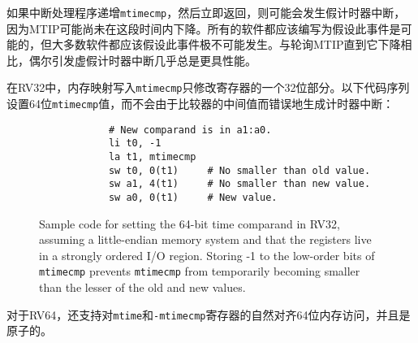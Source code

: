 {\iffalse
\begin{commentary}
	A spurious timer interrupt might occur if an interrupt handler increments {\tt
		mtimecmp} then immediately returns, because MTIP might not yet have fallen in
	the interim.  All software should be written to assume this event is possible,
	but most software should assume this event is extremely unlikely.  It is
	almost always more performant to incur an occasional spurious timer interrupt
	than to poll MTIP until it falls.
\end{commentary}
\fi
\begin{commentary}
如果中断处理程序递增{\tt mtimecmp}，然后立即返回，则可能会发生假计时器中断，因为MTIP可能尚未在这段时间内下降。所有的软件都应该编写为假设此事件是可能的，但大多数软件都应该假设此事件极不可能发生。与轮询MTIP直到它下降相比，偶尔引发虚假计时器中断几乎总是更具性能。
\end{commentary}

\iffalse
In RV32, memory-mapped writes to {\tt mtimecmp} modify only one 32-bit
part of the register.  The following code sequence sets a 64-bit {\tt
	mtimecmp} value without spuriously generating a timer interrupt due
to the intermediate value of the comparand:
\fi
在RV32中，内存映射写入{\tt mtimecmp}只修改寄存器的一个32位部分。以下代码序列设置64位{\tt mtimecmp}值，而不会由于比较器的中间值而错误地生成计时器中断：

\begin{figure}[h!]
	\begin{center}
		\begin{verbatim}
			# New comparand is in a1:a0.
			li t0, -1
			la t1, mtimecmp
			sw t0, 0(t1)     # No smaller than old value.
			sw a1, 4(t1)     # No smaller than new value.
			sw a0, 0(t1)     # New value.
		\end{verbatim}
	\end{center}
	\caption{Sample code for setting the 64-bit time comparand in RV32, assuming
		a little-endian memory system and that the registers live in a strongly
		ordered I/O region.  Storing -1 to the low-order bits of {\tt mtimecmp}
		prevents {\tt mtimecmp} from temporarily becoming smaller than the lesser
		of the old and new values.}
	\label{mtimecmph}
\end{figure}

\iffalse
For RV64, naturally aligned 64-bit memory accesses to the {\tt mtime} and {\tt
	mtimecmp} registers are additionally supported and are atomic.
\fi
对于RV64，还支持对{\tt mtime}和{\tt-mtimecmp}寄存器的自然对齐64位内存访问，并且是原子的。

}

